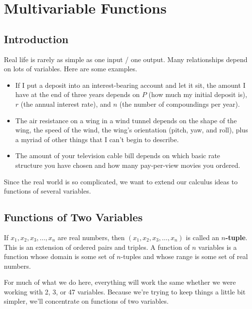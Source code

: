 \section{Multivariable Functions}
\label{sec:multivariable-functions}

\subsection{Introduction}
Real life is rarely as simple as one input / one output. Many relationships depend on lots of variables. Here are some examples.
\begin{itemize}
  \item If I put a deposit into an interest-bearing account and let it sit, the amount I have at the end of three years depends on $P$ (how much my initial deposit is), $r$ (the annual interest rate), and $n$ (the number of compoundings per year).

  \item The air resistance on a wing in a wind tunnel depends on the shape of the wing, the speed of the wind, the wing's orientation (pitch, yaw, and roll), plus a myriad of other things that I can't begin to describe.

  \item The amount of your television cable bill depends on which basic rate structure you have chosen and how many pay-per-view movies you ordered.
\end{itemize}
Since the real world is so complicated, we want to extend our calculus ideas to functions of several variables.

\subsection{Functions of Two Variables}
If $x_1, x_2, x_3,\ldots, x_n$ are real numbers, then $(x_1,x_2,x_3,\ldots, x_n)$ is called an {\bf $n$-tuple}. This is an extension of ordered pairs and triples. A function of $n$ variables is a function whose domain is some set of $n$-tuples and whose range is some set of real numbers.

For much of what we do here, everything will work the same whether we were working with 2, 3, or 47 variables. Because we're trying to keep things a little bit simpler, we'll concentrate on functions of two variables.

